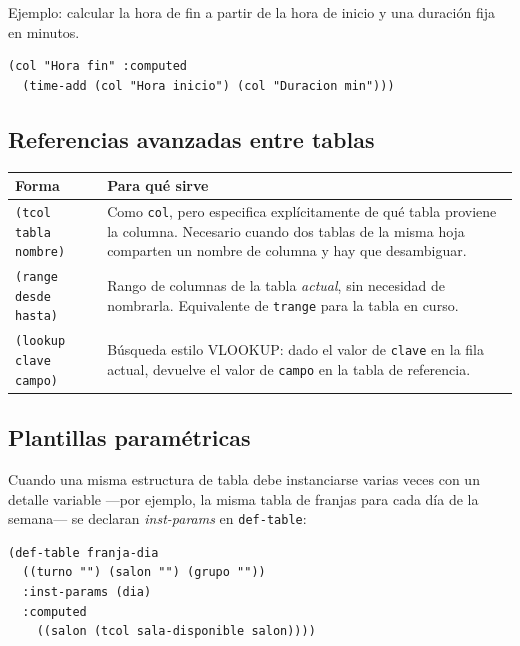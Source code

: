 \documentclass[12pt,a4paper]{report}
\begin{document}
Ejemplo: calcular la hora de fin a partir de la hora de inicio y una
duración fija en minutos.

\begin{lstlisting}
(col "Hora fin" :computed
  (time-add (col "Hora inicio") (col "Duracion min")))
\end{lstlisting}

\subsection*{Referencias avanzadas entre tablas}

\begin{center}
\begin{tabular}{lp{8cm}}
\toprule
\textbf{Forma} & \textbf{Para qué sirve} \\
\midrule
\texttt{(tcol tabla nombre)} & Como \texttt{col}, pero especifica
  explícitamente de qué tabla proviene la columna.  Necesario cuando dos
  tablas de la misma hoja comparten un nombre de columna y hay que
  desambiguar. \\
\texttt{(range desde hasta)} & Rango de columnas de la tabla \emph{actual},
  sin necesidad de nombrarla.  Equivalente de \texttt{trange} para la tabla
  en curso. \\
\texttt{(lookup clave campo)} & Búsqueda estilo VLOOKUP: dado el valor de
  \texttt{clave} en la fila actual, devuelve el valor de \texttt{campo} en
  la tabla de referencia. \\
\bottomrule
\end{tabular}
\end{center}

\subsection*{Plantillas paramétricas}

Cuando una misma estructura de tabla debe instanciarse varias veces con un
detalle variable ---por ejemplo, la misma tabla de franjas para cada día de
la semana--- se declaran \emph{inst-params} en \texttt{def-table}:

\begin{lstlisting}
(def-table franja-dia
  ((turno "") (salon "") (grupo ""))
  :inst-params (dia)
  :computed
    ((salon (tcol sala-disponible salon))))
\end{lstlisting}
\end{document}

